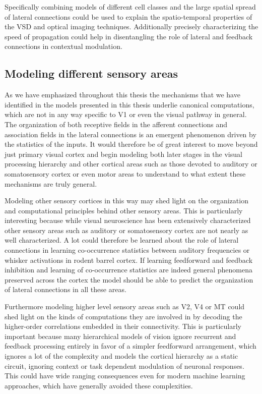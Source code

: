 Specifically combining models of different cell classes and the large
spatial spread of lateral connections could be used to explain the
spatio-temporal properties of the VSD and optical imaging
techniques. Additionally precisely characterizing the speed of
propagation could help in disentangling the role of lateral and
feedback connections in contextual modulation.

\subsection{Modeling different sensory areas}

As we have emphasized throughout this thesis the mechanisms that we
have identified in the models presented in this thesis underlie
canonical computations, which are not in any way specific to V1 or
even the visual pathway in general. The organization of both receptive
fields in the afferent connections and association fields in the
lateral connections is an emergent phenomenon driven by the statistics
of the inputs. It would therefore be of great interest to move beyond
just primary visual cortex and begin modeling both later stages in the
visual processing hierarchy and other cortical areas such as those
devoted to auditory or somatosensory cortex or even motor areas to
understand to what extent these mechanisms are truly general.

Modeling other sensory cortices in this way may shed light on the
organization and computational principles behind other sensory
areas. This is particularly interesting because while visual
neuroscience has been extensively characterized other sensory areas
such as auditory or somatosensory cortex are not nearly as well
characterized. A lot could therefore be learned about the role of
lateral connections in learning co-occurrence statistics between
auditory frequencies or whisker activations in rodent barrel
cortex. If learning feedforward and feedback inhibition and learning
of co-occurrence statistics are indeed general phenomena preserved
across the cortex the model should be able to predict the organization
of lateral connections in all these areas.

Furthermore modeling higher level sensory areas such as V2, V4 or MT
could shed light on the kinds of computations they are involved in by
decoding the higher-order correlations embedded in their
connectivity. This is particularly important because many hierarchical
models of vision ignore recurrent and feedback processing entirely in
favor of a simpler feedforward arrangement, which ignores a lot of
the complexity and models the cortical hierarchy as a static circuit,
ignoring context or task dependent modulation of neuronal
responses. This could have wide ranging consequences even for modern
machine learning approaches, which have generally avoided these
complexities.

